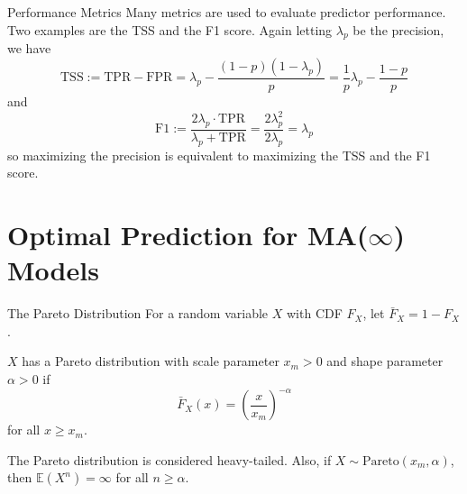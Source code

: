 \documentclass{beamer}
\def\E{\mathbb E}
\begin{document}
\begin{frame}{Performance Metrics}
    Many metrics are used to evaluate predictor performance. Two examples are the TSS and the F1 score. Again letting $\lambda_p$ be the precision, we have
    \[
    \text{TSS} := \text{TPR} - \text{FPR} = \lambda_p - \frac{(1 - p)(1 - \lambda_p)}{p} = \frac{1}{p}\lambda_p - \frac{1 - p}{p}
    \]
    and
    \[
    \text{F1} := \frac{2\lambda_p \cdot \text{TPR}}{\lambda_p + \text{TPR}} = \frac{2\lambda_p^2}{2\lambda_p} = \lambda_p
    \]
    so maximizing the precision is equivalent to maximizing the TSS and the F1 score.
\end{frame}

\section{Optimal Prediction for MA($\infty$) Models}

\begin{frame}{The Pareto Distribution}
    For a random variable $X$ with CDF $F_X$, let $\bar{F}_X = 1 - F_X$.

    \smallskip
    
    $X$ has a Pareto distribution with scale parameter $x_m > 0$ and shape parameter $\alpha > 0$ if
    \[
    \bar{F}_X(x) = \left(\frac{x}{x_m}\right)^{-\alpha}
    \]
    for all $x \ge x_m$.

    \medskip

    The Pareto distribution is considered heavy-tailed. Also, if $X \sim \text{Pareto}(x_m, \alpha)$, then $\E(X^n) = \infty$ for all $n \ge \alpha$.
\end{frame}
\end{document}
